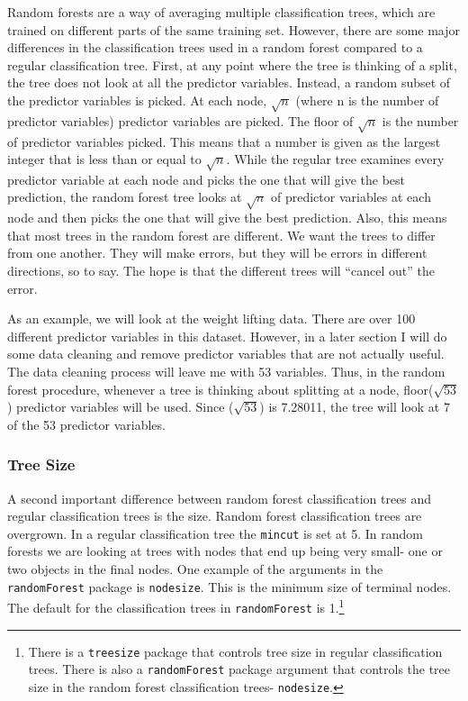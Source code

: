 \documentclass[12pt,twoside]{reedthesis}
\begin{document}
  Random forests are a way of averaging multiple classification trees,
  which are trained on different parts of the same training set. However,
  there are some major differences in the classification trees used in a
  random forest compared to a regular classification tree. First, at any
  point where the tree is thinking of a split, the tree does not look at
  all the predictor variables. Instead, a random subset of the predictor
  variables is picked. At each node, \(\sqrt{n}\) (where n is the number
  of predictor variables) predictor variables are picked. The floor of
  \(\sqrt{n}\) is the number of predictor variables picked. This means
  that a number is given as the largest integer that is less than or equal
  to \(\sqrt{n}\). While the regular tree examines every predictor
  variable at each node and picks the one that will give the best
  prediction, the random forest tree looks at \(\sqrt{n}\) of predictor
  variables at each node and then picks the one that will give the best
  prediction. Also, this means that most trees in the random forest are
  different. We want the trees to differ from one another. They will make
  errors, but they will be errors in different directions, so to say. The
  hope is that the different trees will ``cancel out'' the error.
  
  As an example, we will look at the weight lifting data. There are over
  100 different predictor variables in this dataset. However, in a later
  section I will do some data cleaning and remove predictor variables that
  are not actually useful. The data cleaning process will leave me with 53
  variables. Thus, in the random forest procedure, whenever a tree is
  thinking about splitting at a node, floor(\(\sqrt{53}\)) predictor
  variables will be used. Since (\(\sqrt{53}\)) is 7.28011, the tree will
  look at 7 of the 53 predictor variables.
  
  \subsubsection{Tree Size}\label{tree-size}
  
  A second important difference between random forest classification trees
  and regular classification trees is the size. Random forest
  classification trees are overgrown. In a regular classification tree the
  \texttt{mincut} is set at 5. In random forests we are looking at trees
  with nodes that end up being very small- one or two objects in the final
  nodes. One example of the arguments in the \texttt{randomForest} package
  is \texttt{nodesize}. This is the minimum size of terminal nodes. The
  default for the classification trees in \texttt{randomForest} is
  1.\footnote{There is a \texttt{treesize} package that controls tree size
    in regular classification trees. There is also a \texttt{randomForest}
    package argument that controls the tree size in the random forest
    classification trees- \texttt{nodesize}.}
  
\end{document}
